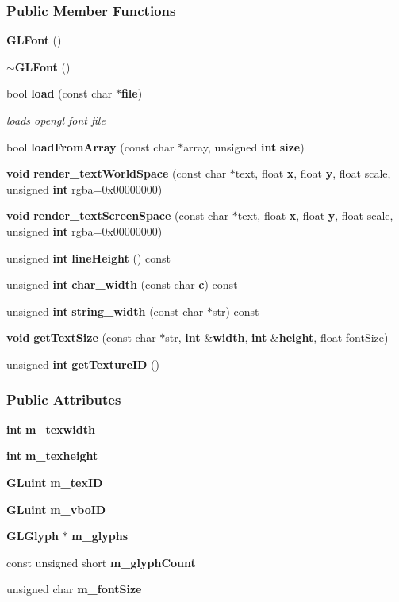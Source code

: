 \subsubsection*{Public Member Functions}
\begin{DoxyCompactItemize}
\item 
{\bf G\+L\+Font} ()
\item 
{\bf $\sim$\+G\+L\+Font} ()
\item 
bool {\bf load} (const char $\ast${\bf file})
\begin{DoxyCompactList}\small\item\em loads opengl font file \end{DoxyCompactList}\item 
bool {\bf load\+From\+Array} (const char $\ast$array, unsigned {\bf int} {\bf size})
\item 
{\bf void} {\bf render\+\_\+text\+World\+Space} (const char $\ast$text, float {\bf x}, float {\bf y}, float scale, unsigned {\bf int} rgba=0x00000000)
\item 
{\bf void} {\bf render\+\_\+text\+Screen\+Space} (const char $\ast$text, float {\bf x}, float {\bf y}, float scale, unsigned {\bf int} rgba=0x00000000)
\item 
unsigned {\bf int} {\bf line\+Height} () const 
\item 
unsigned {\bf int} {\bf char\+\_\+width} (const char {\bf c}) const 
\item 
unsigned {\bf int} {\bf string\+\_\+width} (const char $\ast$str) const 
\item 
{\bf void} {\bf get\+Text\+Size} (const char $\ast$str, {\bf int} \&{\bf width}, {\bf int} \&{\bf height}, float font\+Size)
\item 
unsigned {\bf int} {\bf get\+Texture\+ID} ()
\end{DoxyCompactItemize}
\subsubsection*{Public Attributes}
\begin{DoxyCompactItemize}
\item 
{\bf int} {\bf m\+\_\+texwidth}
\item 
{\bf int} {\bf m\+\_\+texheight}
\item 
{\bf G\+Luint} {\bf m\+\_\+tex\+ID}
\item 
{\bf G\+Luint} {\bf m\+\_\+vbo\+ID}
\item 
{\bf G\+L\+Glyph} $\ast$ {\bf m\+\_\+glyphs}
\item 
const unsigned short {\bf m\+\_\+glyph\+Count}
\item 
unsigned char {\bf m\+\_\+font\+Size}
\end{DoxyCompactItemize}


